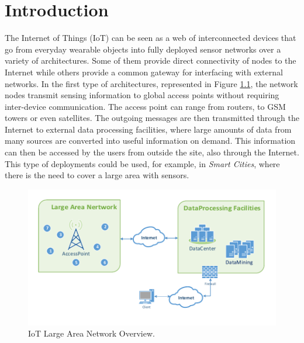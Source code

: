 
\chapter{Introduction}
\label{chapter:introduction}

The Internet of Things (\gls{IoT}) can be seen as a web of interconnected devices that go from everyday wearable objects into fully deployed sensor networks over a variety of architectures. Some of them provide direct connectivity of nodes to the Internet while others provide a common gateway for interfacing with external networks. In the first type of architectures, represented in Figure \ref{fig:net_overview_large}, the network nodes transmit sensing information to global access points without requiring inter-device communication. The access point can range from routers, to GSM towers or even satellites. The outgoing messages are then transmitted through the Internet to external data processing facilities, where large amounts of data from many sources are converted into useful information on demand. This information can then be accessed by the users from outside the site, also through the Internet. This type of deployments could be used, for example, in \emph{Smart Cities}, where there is the need to cover a large area with sensors.
\begin{figure}[h]
  \centering
  \includegraphics[width=0.85\linewidth]{figures/Network_Overview_Sparse.pdf}
  \caption{IoT Large Area Network Overview.}
  \label{fig:net_overview_large}
\end{figure}

